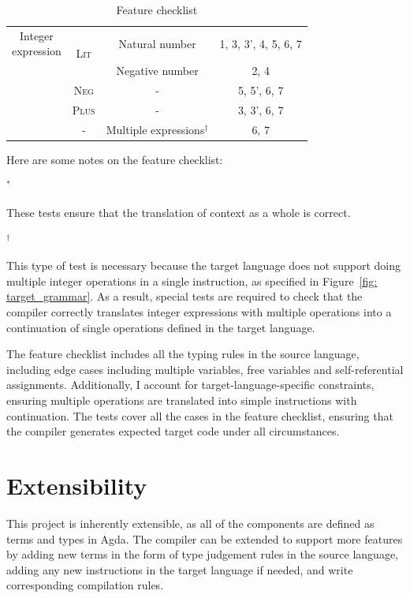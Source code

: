 \documentclass[12pt,a4paper]{report}
\theoremstyle{definition}
\begin{document}
\begin{table}[H]
\begin{tabular}{| c | c | c | c |}
            \multirowcell{5}{Integer\\expression} 
                & \multirow{2}{*}{\textsc{Lit}}  
                    & Natural number  & 1, 3, 3', 4, 5, 6, 7 \\ \cline{3-4}
                &   & Negative number & 2, 4 \\ \cline{2-4}
                & \textsc{Neg} & - & 5, 5', 6, 7  \\ \cline{2-4}
                & \textsc{Plus} & - & 3, 3', 6, 7  \\ \cline{2-4}
                & -             & Multiple expressions\hyperlink{note2}{$^{\dagger}$} & 6, 7 \\
            \hline
        \end{tabular}

        \caption{Feature checklist}
        \label{tab: feature_checklist}
    \end{table}

    Here are some notes on the feature checklist:

    \hypertarget{note1}{$^{\ast}$} These tests ensure that the translation of context as a whole is correct.

    \hypertarget{note2}{$^{\dagger}$} This type of test is necessary because the target language does not support doing multiple integer operations in a single instruction, as specified in Figure~\ref{fig: target_grammar}. As a result, special tests are required to check that the compiler correctly translates integer expressions with multiple operations into a continuation of single operations defined in the target language. 

    \vspace{2.5em}

    The feature checklist includes all the typing rules in the source language, including edge cases including multiple variables, free variables and self-referential assignments. Additionally, I account for target-language-specific constraints, ensuring multiple operations are translated into simple instructions with continuation. The tests cover all the cases in the feature checklist, ensuring that the compiler generates expected target code under all circumstances.

    \section{Extensibility}
    This project is inherently extensible, as all of the components are defined as terms and types in Agda. The compiler can be extended to support more features by adding new terms in the form of type judgement rules in the source language, adding any new instructions in the target language if needed, and write corresponding compilation rules.
\end{document}
